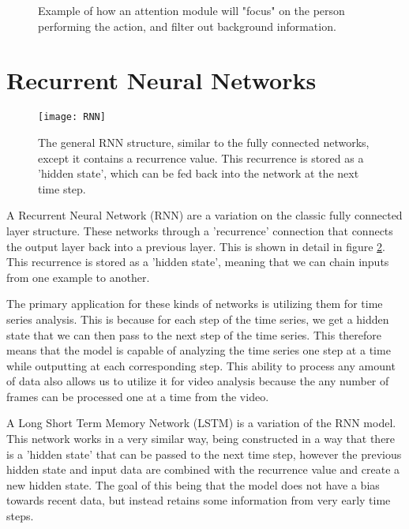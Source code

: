 \begin{figure}[ht]
	\centering
	\caption{Example of how an attention module will "focus" on the person performing the action, and filter out background information.}
	\label{fig:residualattentionnetwork}
\end{figure}

\section{Recurrent Neural Networks}

\begin{figure}[ht]
	\texttt{[image: RNN]}
	\centering
	\caption{The general RNN structure, similar to the fully connected networks, except it contains a recurrence value. This recurrence is stored as a 'hidden state', which can be fed back into the network at the next time step.}
	\label{fig:rnn}
\end{figure}

A Recurrent Neural Network (RNN) are a variation on the classic fully connected layer structure. These networks through a 'recurrence' connection that connects the output layer back into a previous layer. This is shown in detail in figure \ref{fig:rnn}. This recurrence is stored as a 'hidden state', meaning that we can chain inputs from one example to another.

The primary application for these kinds of networks is utilizing them for time series analysis. This is because for each step of the time series, we get a hidden state that we can then pass to the next step of the time series. This therefore means that the model is capable of analyzing the time series one step at a time while outputting at each corresponding step. This ability to process any amount of data also allows us to utilize it for video analysis because the any number of frames can be processed one at a time from the video.

A Long Short Term Memory Network (LSTM) is a variation of the RNN model. This network works in a very similar way, being constructed in a way that there is a 'hidden state' that can be passed to the next time step, however the previous hidden state and input data are combined with the recurrence value and create a new hidden state. The goal of this being that the model does not have a bias towards recent data, but instead retains some information from very early time steps.

